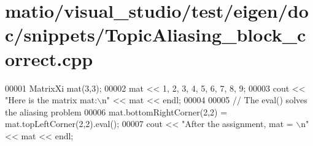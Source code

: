 \hypertarget{matio_2visual__studio_2test_2eigen_2doc_2snippets_2_topic_aliasing__block__correct_8cpp_source}{}\section{matio/visual\+\_\+studio/test/eigen/doc/snippets/\+Topic\+Aliasing\+\_\+block\+\_\+correct.cpp}
\label{matio_2visual__studio_2test_2eigen_2doc_2snippets_2_topic_aliasing__block__correct_8cpp_source}

\begin{DoxyCode}
00001 MatrixXi mat(3,3); 
00002 mat << 1, 2, 3,   4, 5, 6,   7, 8, 9;
00003 cout << \textcolor{stringliteral}{"Here is the matrix mat:\(\backslash\)n"} << mat << endl;
00004 
00005 \textcolor{comment}{// The eval() solves the aliasing problem}
00006 mat.bottomRightCorner(2,2) = mat.topLeftCorner(2,2).eval();
00007 cout << \textcolor{stringliteral}{"After the assignment, mat = \(\backslash\)n"} << mat << endl;
\end{DoxyCode}
